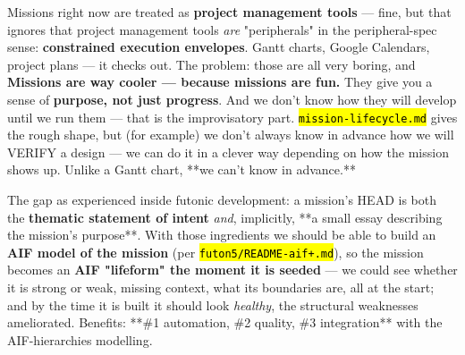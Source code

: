 \documentclass[11pt,oneside]{article}
\newcommand{\scopehl}[1]{\texttt{\hl{#1}}}
\begin{document}
\begin{phasebox}[title={1. IDENTIFY}]

\begin{subbox}[title={The gap (Joe, 2026-06-10, verbatim sense)}]

Missions right now are treated as \textbf{project management tools} --- fine, but
that ignores that project management tools \emph{are} "peripherals" in the
peripheral-spec sense: \textbf{constrained execution envelopes}. Gantt charts,
Google Calendars, project plans --- it checks out. The problem: those are all
very boring, and \textbf{Missions are way cooler --- because missions are fun.} They
give you a sense of \textbf{purpose, not just progress}. And we don't know how
they will develop until we run them --- that is the improvisatory part.
\scopehl{mission-lifecycle.md} gives the rough shape, but (for example) we don't
always know in advance how we will VERIFY a design --- we can do it in a clever
way depending on how the mission shows up. Unlike a Gantt chart, **we can't
know in advance.**

The gap as experienced inside futonic development: a mission's HEAD is both
the \textbf{thematic statement of intent} \emph{and}, implicitly, **a small essay
describing the mission's purpose**. With those ingredients we should be able
to build an \textbf{AIF model of the mission} (per \scopehl{futon5/README-aif+.md}), so the
mission becomes an \textbf{AIF "lifeform" the moment it is seeded} --- we could see
whether it is strong or weak, missing context, what its boundaries are, all
at the start; and by the time it is built it should look \emph{healthy}, the
structural weaknesses ameliorated. Benefits: **\#1 automation, \#2 quality,
\#3 integration** with the AIF-hierarchies modelling.

\end{subbox}
\begin{subbox}[title={Where the gap is already palpable in the stack (evidence pass, 2026-06-10)}]


\end{subbox}
\end{phasebox}
\end{document}
